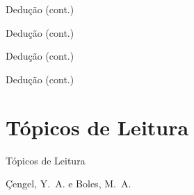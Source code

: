    \begin{frame}{Dedução (cont.)}\vspace*{-1em}
    \end{frame}

    \begin{frame}{Dedução (cont.)}\vspace*{-1em}
    \end{frame}

    \begin{frame}{Dedução (cont.)}\vspace*{-1em}
    \end{frame}

    \begin{frame}{Dedução (cont.)}\vspace*{-1em}
    \end{frame}

\section{Tópicos de Leitura}

    \begin{frame}[allowframebreaks]{Tópicos de Leitura}
        \begin{thebibliography}{Çengel, Y.~A., 2013}
                Çengel, Y.~A. e Boles, M.~A.
        \end{thebibliography}
    \end{frame}




